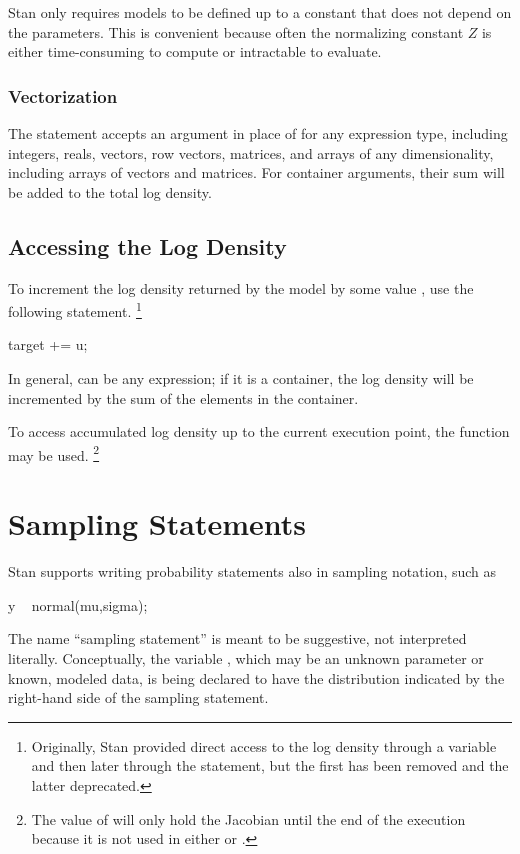 Stan only requires models to be defined up to a constant that does not
depend on the parameters.  This is convenient because often the
normalizing constant $Z$ is either time-consuming to compute or
intractable to evaluate.

\subsubsection{Vectorization}

The  statement accepts an argument in place of
 for any expression type, including integers, reals,
vectors, row vectors, matrices, and arrays of any dimensionality,
including arrays of vectors and matrices.   For container arguments,
their sum will be added to the total log density.

\subsection{Accessing the Log Density}

To increment the log density returned by the model by some value
, use the following statement.%
%
\footnote{Originally, Stan provided direct access to the log density
  through a variable  and then later through the
   statement, but the first has been
  removed and the latter deprecated.}
%
\begin{stancode}
target += u;
\end{stancode}
%
In general,  can be any expression;  if it is a container, the
log density will be incremented by the sum of the elements in the
container.

To access accumulated log density up to the current execution point,
the function  may be used.%
%
\footnote{The value of  will only hold the Jacobian until
  the end of the execution because it is not used in either
   or .}


\section{Sampling Statements}\label{sampling-statements.section}

Stan supports writing probability statements also in sampling
notation, such as
%
\begin{stancode}
y ~ normal(mu,sigma);
\end{stancode}
%
The name ``sampling statement'' is meant to be suggestive, not
interpreted literally.  Conceptually, the variable , which may
be an unknown parameter or known, modeled data, is being declared
to have the distribution indicated by the right-hand side of the
sampling statement.

